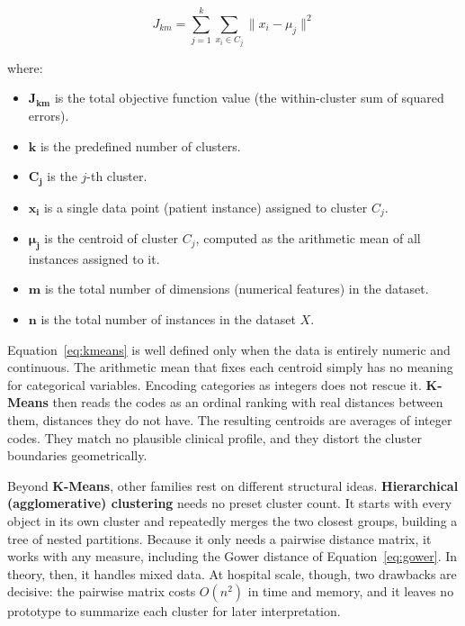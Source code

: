 \begin{equation}
    J_{km} = \sum_{j=1}^{k} \sum_{x_i \in C_j} \|x_i - \mu_j\|^2
    \label{eq:kmeans}
\end{equation}

where:
\begin{itemize}
    \item $\boldsymbol{J_{km}}$ is the total objective function value (the within-cluster sum of squared errors).
    \item $\boldsymbol{k}$ is the predefined number of clusters.
    \item $\boldsymbol{C_j}$ is the $j$-th cluster.
    \item $\boldsymbol{x_i}$ is a single data point (patient instance) assigned to cluster $C_j$.
    \item $\boldsymbol{\mu_j}$ is the centroid of cluster $C_j$, computed as the arithmetic mean of all instances assigned to it.
    \item $\boldsymbol{m}$ is the total number of dimensions (numerical features) in the dataset.
    \item $\boldsymbol{n}$ is the total number of instances in the dataset $X$.
\end{itemize}

\vspace{1em}

Equation~\eqref{eq:kmeans} is well defined only when the data is entirely numeric and continuous. The arithmetic mean that fixes each centroid simply has no meaning for categorical variables. Encoding categories as integers does not rescue it. \textbf{K-Means} then reads the codes as an ordinal ranking with real distances between them, distances they do not have. The resulting centroids are averages of integer codes. They match no plausible clinical profile, and they distort the cluster boundaries geometrically.

Beyond \textbf{K-Means}, other families rest on different structural ideas. \textbf{Hierarchical (agglomerative) clustering} \cite{kaufman1990} needs no preset cluster count. It starts with every object in its own cluster and repeatedly merges the two closest groups, building a tree of nested partitions. Because it only needs a pairwise distance matrix, it works with any measure, including the Gower distance of Equation~\eqref{eq:gower}. In theory, then, it handles mixed data. At hospital scale, though, two drawbacks are decisive: the pairwise matrix costs $O(n^2)$ in time and memory, and it leaves no prototype to summarize each cluster for later interpretation.

